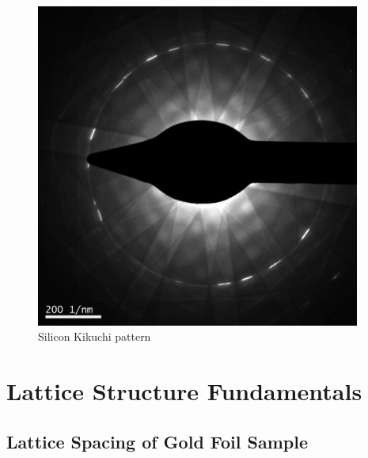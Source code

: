 \documentclass[12pt,a4paper]{article}
\begin{document}
\begin{figure}[htbp]
  \centering
  \includegraphics[width=0.95\textwidth]{data/Image6 Si_Kikuchi.png}
  \caption{Silicon Kikuchi pattern}
  \label{fig:kikuchi}
\end{figure}


\section{Lattice Structure Fundamentals} %
\label{sec:lattice_structure_fundamentals}

\lipsum[20]

\subsection{Lattice Spacing of Gold Foil Sample} %
\label{sub:lattice_spacing_of_gold_foil_sample}

\lipsum[20]
\end{document}
